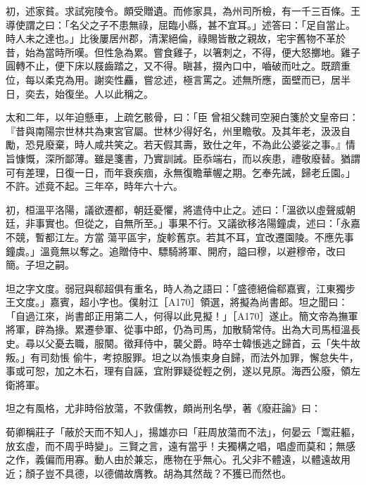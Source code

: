 \begin{pinyinscope}
 初，述家貧。求試宛陵令。頗受贈遺。而修家具，為州司所檢，有一千三百條。王導使謂之曰：「名父之子不患無祿，屈臨小縣，甚不宜耳。」述答曰：「足自當止。時人未之達也。」比後屢居州郡，清潔絕倫，祿賜皆散之親故，宅宇舊物不革於昔，始為當時所嘆。但性急為累。嘗食雞子，以箸刺之，不得，便大怒擲地。雞子圓轉不止，便下床以屐齒踏之，又不得。瞋甚，掇內口中，嚙破而吐之。既躋重位，每以柔克為用。謝奕性麤，嘗忿述，極言罵之。述無所應，面壁而已，居半日，奕去，始復坐。人以此稱之。



 太和二年，以年迫懸車，上疏乞骸骨，曰：「臣
 曾祖父魏司空昶白箋於文皇帝曰：『昔與南陽宗世林共為東宮官屬。世林少得好名，州里瞻敬。及其年老，汲汲自勵，恐見廢棄，時人咸共笑之。若天假其壽，致仕之年，不為此公婆娑之事。』情旨慷慨，深所鄙薄。雖是箋書，乃實訓誡。臣忝端右，而以疾患，禮敬廢替。猶謂可有差理，日復一日，而年衰疾痼，永無復瞻華幄之期。乞奉先誡，歸老丘園。」不許。述竟不起。三年卒，時年六十六。



 初，桓溫平洛陽，議欲遷都，朝廷憂懼，將遣侍中止之。述曰：「溫欲以虛聲威朝廷，非事實也。但從之，自無所至。」事果不行。又議欲移洛陽鐘虡，述曰：「永嘉不競，暫都江左。方當
 蕩平區宇，旋軫舊京。若其不耳，宜改遷園陵。不應先事鐘虡。」溫竟無以奪之。追贈侍中、驃騎將軍、開府，謚曰穆，以避穆帝，改曰簡。子坦之嗣。



 坦之字文度。弱冠與郗超俱有重名，時人為之語曰：「盛德絕倫郗嘉賓，江東獨步王文度。」嘉賓，超小字也。僕射江［A170］領選，將擬為尚書郎。坦之聞曰：「自過江來，尚書郎正用第二人，何得以此見擬！」［A170］遂止。簡文帝為撫軍將軍，辟為掾。累遷參軍、從事中郎，仍為司馬，加散騎常侍。出為大司馬桓溫長史。尋以父憂去職，服闋。徵拜侍中，襲父爵。時卒士韓悵逃之歸首，云「失牛故叛。」有司劾悵
 偷牛，考掠服罪。坦之以為悵束身自歸，而法外加罪，懈怠失牛，事或可恕，加之木石，理有自誣，宜附罪疑從輕之例，遂以見原。海西公廢，領左衛將軍。



 坦之有風格，尤非時俗放蕩，不敦儒教，頗尚刑名學，著《廢莊論》曰：



 荀卿稱莊子「蔽於天而不知人」，揚雄亦曰「莊周放蕩而不法」，何晏云「鬻莊軀，放玄虛，而不周乎時變」。三賢之言，遠有當乎！夫獨構之唱，唱虛而莫和；無感之作，義偏而用寡。動人由於兼忘，應物在乎無心。孔父非不體遠，以體遠故用近；顏子豈不具德，以德備故膺教。胡為其然哉？不獲已而然也。




\end{pinyinscope}
